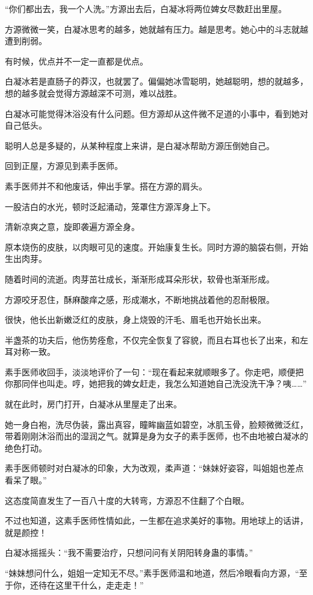 \begin{this_body}
“你们都出去，我一个人洗。”方源出去后，白凝冰将两位婢女尽数赶出里屋。

方源微微一笑，白凝冰思考的越多，她就越有压力。越是思考。她心中的斗志就越遭到削弱。

有时候，优点并不一定一直都是优点。

白凝冰若是直肠子的莽汉，也就罢了。偏偏她冰雪聪明，她越聪明，想的就越多，想的越多就会觉得方源越深不可测，难以战胜。

白凝冰可能觉得沐浴没有什么问题。但方源却从这件微不足道的小事中，看到她对自己低头。

聪明人总是多疑的，从某种程度上来讲，是白凝冰帮助方源压倒她自己。

回到正屋，方源见到素手医师。

素手医师并不和他废话，伸出手掌。搭在方源的肩头。

一股洁白的水光，顿时泛起涌动，笼罩住方源浑身上下。

清新凉爽之意，旋即袭遍方源全身。

原本烧伤的皮肤，以肉眼可见的速度。开始康复生长。同时方源的脑袋右侧，开始生出肉芽。

随着时间的流逝。肉芽茁壮成长，渐渐形成耳朵形状，软骨也渐渐形成。

方源咬牙忍住，酥麻酸痒之感，形成潮水，不断地挑战着他的忍耐极限。

很快，他长出新嫩泛红的皮肤，身上烧毁的汗毛、眉毛也开始长出来。

半盏茶的功夫后，他伤势痊愈，不仅完全恢复了容貌，而且右耳也长了出来，和左耳对称一致。

素手医师收回手，淡淡地评价了一句：“现在看起来就顺眼多了。你走吧，顺便把你那同伴也叫走。哼，她把我的婢女赶走，我怎么知道她自己洗没洗干净？咦……”

就在此时，房门打开，白凝冰从里屋走了出来。

她一身白袍，洗尽伪装，露出真容，瞳眸幽蓝如碧空，冰肌玉骨，脸颊微微泛红，带着刚刚沐浴而出的湿润之气。就算是身为女子的素手医师，也不由地被白凝冰的绝色打动。

素手医师顿时对白凝冰的印象，大为改观，柔声道：“妹妹好姿容，叫姐姐也差点看呆了眼。”

这态度简直发生了一百八十度的大转弯，方源忍不住翻了个白眼。

不过也知道，这素手医师性情如此，一生都在追求美好的事物。用地球上的话讲，就是颜控！

白凝冰摇摇头：“我不需要治疗，只想问问有关阴阳转身蛊的事情。”

“妹妹想问什么，姐姐一定知无不尽。”素手医师温和地道，然后冷眼看向方源，“至于你，还待在这里干什么，走走走！”


\end{this_body}
